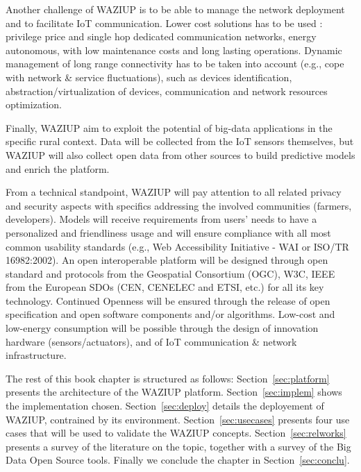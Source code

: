 Another challenge of WAZIUP is to be able to manage the network deployment and to facilitate IoT communication. 
Lower cost solutions has to be used : privilege price and single hop dedicated communication networks, energy autonomous, with low maintenance costs and long lasting operations.
Dynamic management of long range connectivity has to be taken into account (e.g., cope with network \& service fluctuations), such as devices identification, abstraction/virtualization of devices, communication and network resources optimization.

Finally, WAZIUP aim to exploit the potential of big-data applications in the specific rural context. Data will be collected from the IoT sensors themselves, but WAZIUP will also collect open data from other sources to build predictive models and enrich the platform. 

From a technical standpoint, WAZIUP will pay attention to all related privacy and security aspects with specifics addressing the involved communities (farmers, developers).
Models will receive requirements from users’ needs to have a personalized and friendliness usage and will ensure compliance with all most common usability standards (e.g., Web Accessibility Initiative - WAI or ISO/TR 16982:2002). 
An open interoperable platform will be designed through open standard and protocols from the Geospatial Consortium (OGC), W3C, IEEE from the European SDOs (CEN, CENELEC and ETSI, etc.) for all its key technology.
Continued Openness will be ensured through the release of open specification and open software components and/or algorithms.
Low-cost and low-energy consumption will be possible through the design of innovation hardware (sensors/actuators), and of IoT communication \& network infrastructure.


The rest of this book chapter is structured as follows: Section~\ref{sec:platform} presents the architecture of the WAZIUP platform. 
Section~\ref{sec:implem} shows the implementation chosen. 
Section~\ref{sec:deploy} details the deployement of WAZIUP, contrained by its environment.
Section~\ref{sec:usecases} presents four use cases that will be used to validate the WAZIUP concepts.
Section~\ref{sec:relworks} presents a survey of the literature on the topic, together with a survey of the Big Data Open Source tools.
Finally we conclude the chapter in Section~\ref{sec:conclu}.
